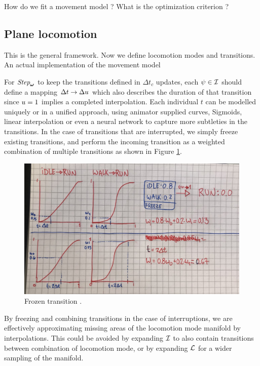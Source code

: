 How do we fit a movement model ? What is the optimization criterion ?

\subsection{Plane locomotion}

This is the general framework. Now we define locomotion modes and transitions. An actual implementation of the movement model

For $\textit{Step}_{\boldsymbol{\omega }}$ to keep the transitions defined in $\Delta{t}_c$ updates, each $\psi\in\mathcal{I}$ should define a mapping $\Delta{t} \rightarrow \Delta u$ which also describes the duration of that transition since $u=1$ implies a completed interpolation. Each individual $t$ can be modelled uniquely or in a unified approach, using animator supplied curves, Sigmoids, linear interpolation or even a neural network to capture more subtleties in the transitions. In the case of transitions that are interrupted, we simply freeze existing transitions, and perform the incoming transition as a weighted combination of multiple transitions as shown in Figure \ref{fig:frozen-transition}. 
\begin{figure}
    \centering
    \includegraphics[width=0.75\columnwidth]{img/frozen-transitions}
    \caption{Frozen transition .}
  \label{fig:frozen-transition}
\end{figure}

By freezing and combining transitions in the case of interruptions, we are effectively approximating missing areas of the locomotion mode manifold by interpolations. This could be avoided by expanding $\mathcal{I}$ to also contain transitions between combination of locomotion mode, or by expanding $\mathcal{L}$ for a wider sampling of the manifold.

